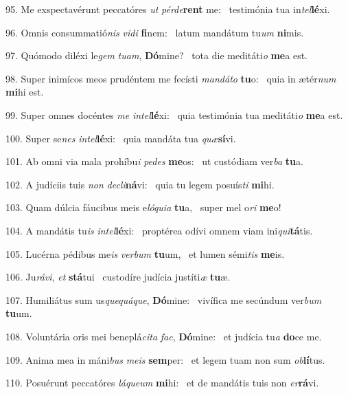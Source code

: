 95. Me exspectavérunt peccatóres \textit{ut} \textit{pér}\textit{de}\textbf{rent} me: \ast\  testimónia tua in\textit{tel}\textbf{lé}xi.\

96. Omnis consummatió\textit{nis} \textit{vi}\textit{di} \textbf{fi}nem: \ast\  latum mandátum tu\textit{um} \textbf{ni}mis.\

97. Quómodo diléxi le\textit{gem} \textit{tu}\textit{am}, \textbf{Dó}mine? \ast\  tota die meditáti\textit{o} \textbf{me}a est.\

98. Super inimícos meos prudéntem me fecísti \textit{man}\textit{dá}\textit{to} \textbf{tu}o: \ast\  quia in ætér\textit{num} \textbf{mi}hi est.\

99. Super omnes docéntes \textit{me} \textit{in}\textit{tel}\textbf{lé}xi: \ast\  quia testimónia tua meditáti\textit{o} \textbf{me}a est.\

100. Super se\textit{nes} \textit{in}\textit{tel}\textbf{lé}xi: \ast\  quia mandáta tua \textit{quæ}\textbf{sí}vi.\

101. Ab omni via mala prohíbu\textit{i} \textit{pe}\textit{des} \textbf{me}os: \ast\  ut custódiam ver\textit{ba} \textbf{tu}a.\

102. A judíciis tuis \textit{non} \textit{de}\textit{cli}\textbf{ná}vi: \ast\  quia tu legem posuís\textit{ti} \textbf{mi}hi.\

103. Quam dúlcia fáucibus meis e\textit{ló}\textit{qui}\textit{a} \textbf{tu}a, \ast\  super mel o\textit{ri} \textbf{me}o!\

104. A mandátis tu\textit{is} \textit{in}\textit{tel}\textbf{lé}xi: \ast\  proptérea odívi omnem viam ini\textit{qui}\textbf{tá}tis.\

105. Lucérna pédibus me\textit{is} \textit{ver}\textit{bum} \textbf{tu}um, \ast\  et lumen sémi\textit{tis} \textbf{me}is.\

106. Ju\textit{rá}\textit{vi}, \textit{et} \textbf{stá}tui \ast\  custodíre judícia justíti\textit{æ} \textbf{tu}æ.\

107. Humiliátus sum us\textit{que}\textit{quá}\textit{que}, \textbf{Dó}mine: \ast\  vivífica me secúndum ver\textit{bum} \textbf{tu}um.\

108. Voluntária oris mei beneplá\textit{ci}\textit{ta} \textit{fac}, \textbf{Dó}mine: \ast\  et judícia tu\textit{a} \textbf{do}ce me.\

109. Anima mea in máni\textit{bus} \textit{me}\textit{is} \textbf{sem}per: \ast\  et legem tuam non sum \textit{ob}\textbf{lí}tus.\

110. Posuérunt peccatóres \textit{lá}\textit{que}\textit{um} \textbf{mi}hi: \ast\  et de mandátis tuis non \textit{er}\textbf{rá}vi.\

